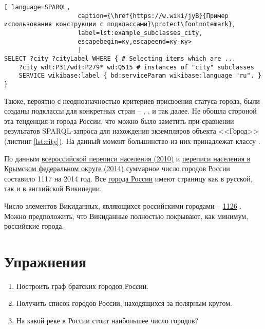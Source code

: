 \begin{lstlisting}[ language=SPARQL, 
                    caption={\href{https://w.wiki/jyB}{Пример использования конструкции с подклассами}\protect\footnotemark},
                    label=lst:example_subclasses_city, 
                    escapebegin=ку,escapeend=ку-ку>
                    ]
SELECT ?city ?cityLabel WHERE { # Selecting items which are ...
	?city wdt:P31/wdt:P279* wd:Q515 # instances of "city" subclasses
	SERVICE wikibase:label { bd:serviceParam wikibase:language "ru". }
}
\end{lstlisting}

Также, вероятно с неоднозначностью критериев присвоения статуса города, были созданы подклассы для конкретных стран -- , ,  и так далее. Не обошла стороной эта тенденция и города России, что можно было заметить при сравнении результатов SPARQL-запроса для нахождения экземпляров объекта <<Город>> (листинг \ref{lst:city}). На данный момент большинство из них принадлежат классу .

По данным \href{http://www.gks.ru/free_doc/new_site/perepis2010/croc/Documents/Vol1/pub-01-03.pdf}{всероссийской переписи населения (2010)} и \href{https://rosstat.gov.ru/free_doc/new_site/population/demo/perepis_krim/KRUM_2015.pdf}{переписи населения в Крымском федеральном округе (2014)} суммарное число городов России составило \num{1117} на 2014 год. Все \href{https://bit.ly/32yqpw5}{города России} имеют страницу как в русской, так и в английской Википедии.

Число элементов Викиданных, являющихся российскими городами -- \href{https://w.wiki/jyP}{1126} . Можно предположить, что Викиданные полностью покрывают, как минимум, российские города. 

\section{Упражнения}
\begin{enumerate}
\item Построить граф братских городов России.
\item Получить список городов России, находящихся за полярным кругом.
\item На какой реке в России стоит наибольшее число городов?
\end{enumerate}